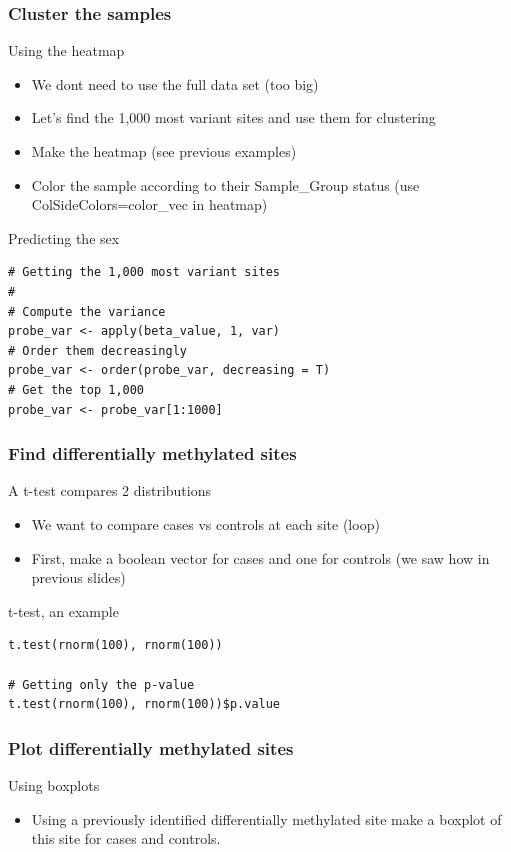 \documentclass[10pt]{beamer}
\newenvironment{xframe}[2][]
  {\begin{frame}[fragile,environment=xframe,#1]
  \frametitle{#2}}
  {\end{frame}}
\begin{document}
\begin{xframe}{Cluster the samples}
  \begin{block}{Using the heatmap}
    \begin{itemize}
      \item We dont need to use the full data set (too big)
      \item Let's find the 1,000 most variant sites and use them for clustering
      \item Make the heatmap (see previous examples)
      \item Color the sample according to their Sample\_Group status (use
      ColSideColors=color\_vec in heatmap)
    \end{itemize}
      \end{block}
    \begin{exampleblock}{Predicting the sex}
\begin{verbatim}
# Getting the 1,000 most variant sites
#
# Compute the variance
probe_var <- apply(beta_value, 1, var)
# Order them decreasingly
probe_var <- order(probe_var, decreasing = T)
# Get the top 1,000
probe_var <- probe_var[1:1000]
\end{verbatim}  
  \end{exampleblock}   

\end{xframe}


\begin{xframe}{Find differentially methylated sites}
  \begin{block}{A t-test compares 2 distributions}
    \begin{itemize}
      \item We want to compare {\sf cases} vs {\sf controls} at each site
      (loop)
      \item First, make a boolean vector for cases and one for controls (we saw
      how in previous slides)
    \end{itemize}
      \end{block}
    \begin{exampleblock}{t-test, an example}
\begin{verbatim}
t.test(rnorm(100), rnorm(100))

# Getting only the p-value
t.test(rnorm(100), rnorm(100))$p.value

\end{verbatim}  
  \end{exampleblock}   
\end{xframe}

\begin{xframe}{Plot differentially methylated sites}
  \begin{block}{Using boxplots}
    \begin{itemize}
      \item Using a previously identified differentially methylated site make a
      boxplot of this site for {\sf cases} and {\sf controls}.
    \end{itemize}
  \end{block}
\end{xframe}
\end{document}
